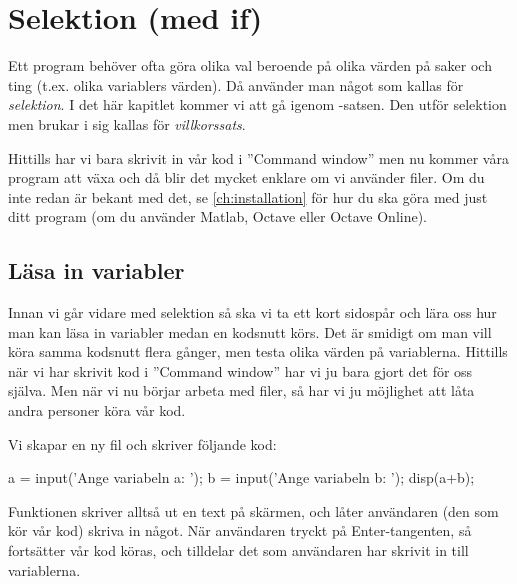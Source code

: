 %
%

\chapter{Selektion (med if)}\label{ch:selektion}
Ett program behöver ofta göra olika val beroende på olika värden på saker och ting (t.ex. olika variablers värden). Då använder man något som kallas för \emph{selektion}. I det här kapitlet kommer vi att gå igenom -satsen. Den utför selektion men brukar i sig kallas för \emph{villkorssats}.

Hittills har vi bara skrivit in vår kod i ''Command window'' men nu kommer våra program att växa och då blir det mycket enklare om vi använder filer. Om du inte redan är bekant med det, se \autoref{ch:installation} för hur du ska göra med just ditt program (om du använder Matlab, Octave eller Octave Online).

\section{Läsa in variabler}
Innan vi går vidare med selektion så ska vi ta ett kort sidospår och lära oss hur man kan läsa in variabler medan en kodsnutt körs. Det är smidigt om man vill köra samma kodsnutt flera gånger, men testa olika värden på variablerna. Hittills när vi har skrivit kod i ''Command window'' har vi ju bara gjort det för oss själva. Men när vi nu börjar arbeta med filer, så har vi ju möjlighet att låta andra personer köra vår kod.

Vi skapar en ny fil och skriver följande kod:

\begin{matlab}[caption={Läsa in variabler},label={}]
a = input('Ange variabeln a: ');
b = input('Ange variabeln b: ');
disp(a+b);
\end{matlab}

Funktionen  skriver alltså ut en text på skärmen, och låter användaren (den som kör vår kod) skriva in något. När användaren tryckt på Enter-tangenten, så fortsätter vår kod köras, och tilldelar det som användaren har skrivit in till variablerna.

